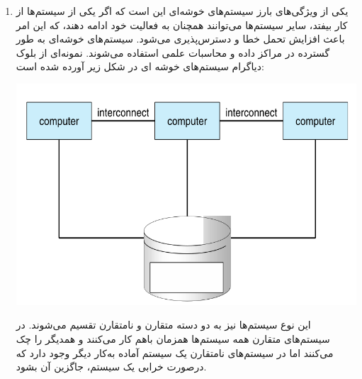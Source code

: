 \begin{qsolve}
	\begin{enumerate}
		\item []
		
		یکی از ویژگی‌های بارز سیستم‌های خوشه‌ای این است که اگر یکی از سیستم‌ها از کار بیفتد، سایر سیستم‌ها می‌توانند همچنان به فعالیت خود ادامه دهند، که این امر باعث افزایش تحمل خطا و دسترس‌پذیری می‌شود. سیستم‌های خوشه‌ای به طور گسترده در مراکز داده و محاسبات علمی استفاده می‌شوند. نمونه‌ای از بلوک دیاگرام سیستم‌های خوشه ای در شکل زیر آورده شده است:
		
		\begin{center}
			\includegraphics*[width=0.7\linewidth]{pics/img5.png}
		\end{center}
		
		این نوع سیستم‌ها نیز به دو دسته متقارن و نامتقارن تقسیم می‌شوند. در سیستم‌های متقارن همه سیستم‌ها همزمان باهم کار می‌کنند و همدیگر را چک می‌کنند اما در سیستم‌های نامتقارن یک سیستم آماده به‌کار دیگر وجود دارد که درصورت خرابی یک سیستم، جاگزین آن بشود.
	\end{enumerate}
	
\end{qsolve}

